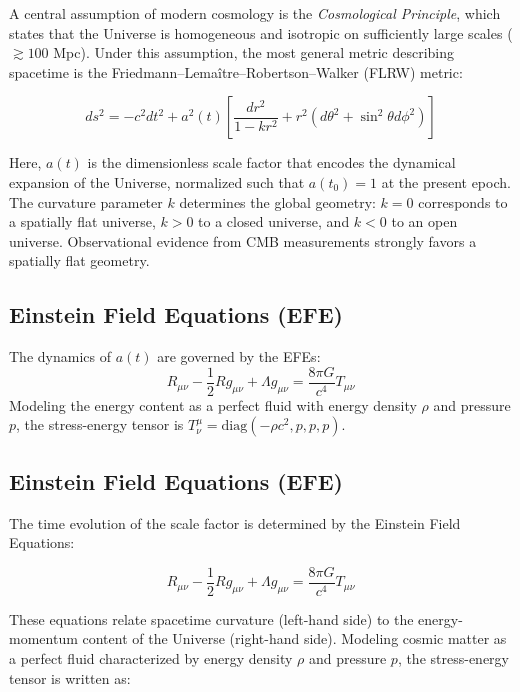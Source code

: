 \documentclass[12pt, a4paper]{article}
\begin{document}
A central assumption of modern cosmology is the \textit{Cosmological Principle}, which states that the Universe is homogeneous and isotropic on sufficiently large scales ($\gtrsim 100$ Mpc). Under this assumption, the most general metric describing spacetime is the Friedmann–Lemaître–Robertson–Walker (FLRW) metric:

\begin{equation}
ds^2 = -c^2 dt^2 + a^2(t) \left[ \frac{dr^2}{1 - kr^2} + r^2 (d\theta^2 + \sin^2\theta d\phi^2) \right]
\end{equation}

Here, $a(t)$ is the dimensionless scale factor that encodes the dynamical expansion of the Universe, normalized such that $a(t_0)=1$ at the present epoch. The curvature parameter $k$ determines the global geometry: $k=0$ corresponds to a spatially flat universe, $k>0$ to a closed universe, and $k<0$ to an open universe. Observational evidence from CMB measurements strongly favors a spatially flat geometry.

\subsection{Einstein Field Equations (EFE)}
The dynamics of $a(t)$ are governed by the EFEs:
\begin{equation}
R_{\mu\nu} - \frac{1}{2}R g_{\mu\nu} + \Lambda g_{\mu\nu} = \frac{8\pi G}{c^4} T_{\mu\nu}
\end{equation}
Modeling the energy content as a perfect fluid with energy density $\rho$ and pressure $p$, the stress-energy tensor is $T^{\mu}_{\nu} = \text{diag}(-\rho c^2, p, p, p)$.

\subsection{Einstein Field Equations (EFE)}

The time evolution of the scale factor is determined by the Einstein Field Equations:

\begin{equation}
R_{\mu\nu} - \frac{1}{2}R g_{\mu\nu} + \Lambda g_{\mu\nu} = \frac{8\pi G}{c^4} T_{\mu\nu}
\end{equation}

These equations relate spacetime curvature (left-hand side) to the energy-momentum content of the Universe (right-hand side). Modeling cosmic matter as a perfect fluid characterized by energy density $\rho$ and pressure $p$, the stress-energy tensor is written as:
\end{document}
